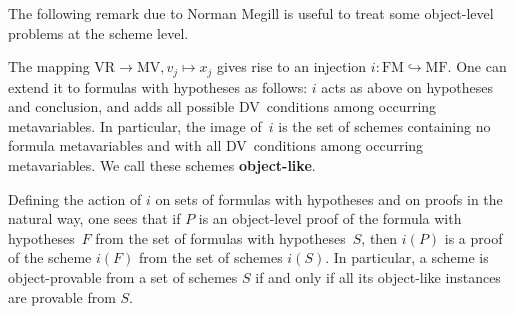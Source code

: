 \documentclass[11pt]{article}
\newcommand*{\VR}{\mathrm{VR}}
\newcommand*{\MV}{\mathrm{MV}}
\newcommand*{\MF}{\mathrm{MF}}
\newcommand*{\FM}{\mathrm{FM}}
\theoremstyle{plain}
\theoremstyle{definition}
\theoremstyle{remark}
\begin{document}
The following remark due to Norman Megill is useful to treat some object-level problems at the
scheme level.

The mapping $\VR \to \MV, v_j \mapsto x_j$ gives rise to an injection
$i \colon \FM \hookrightarrow \MF$.
One can extend it to formulas with hypotheses as follows: $i$ acts as above on hypotheses and
conclusion, and adds all possible DV~conditions among occurring metavariables.
In particular, the image of~$i$ is the set of schemes containing no formula metavariables and with
all DV~conditions among occurring metavariables.
We call these schemes \textbf{object-like}.

Defining the action of $i$ on sets of formulas with hypotheses and on proofs in the natural way,
one sees that if $P$ is an object-level proof of the formula with hypotheses~$F$ from the set of
formulas with hypotheses~$S$, then $i(P)$ is a proof of the scheme $i(F)$ from the set of
schemes $i(S)$.
In particular, a scheme is object-provable from a set of schemes $S$ if and only if all its
object-like instances are provable from $S$.
\end{document}
